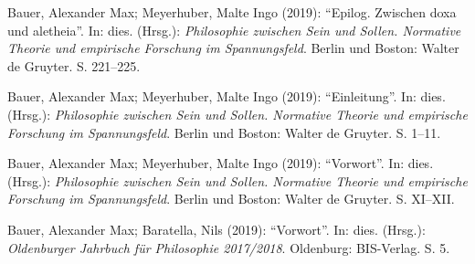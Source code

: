 \documentclass[a4paper,10pt]{article}
\newenvironment{literature}{%
   \parskip6pt\parindent0pt\raggedright
   \def\lititem{\hangindent=1cm\hangafter1}}{%
   \par\ignorespaces}
\begin{document}
\begin{literature}
\lititem Bauer, Alexander Max; Meyerhuber, Malte Ingo (2019): \enquote{Epilog. Zwischen doxa und aletheia}. In: dies. (Hrsg.): \textit{Philosophie zwischen Sein und Sollen. Normative Theorie und empirische Forschung im Spannungsfeld}. Berlin und Boston: Walter de Gruyter. S. 221--225.

\lititem Bauer, Alexander Max; Meyerhuber, Malte Ingo (2019): \enquote{Einleitung}. In: dies. (Hrsg.): \textit{Philosophie zwischen Sein und Sollen. Normative Theorie und empirische Forschung im Spannungsfeld}. Berlin und Boston: Walter de Gruyter. S. 1--11.

\lititem Bauer, Alexander Max; Meyerhuber, Malte Ingo (2019): \enquote{Vorwort}. In: dies. (Hrsg.): \textit{Philosophie zwischen Sein und Sollen. Normative Theorie und empirische Forschung im Spannungsfeld}. Berlin und Boston: Walter de Gruyter. S. XI--XII.

\lititem Bauer, Alexander Max; Baratella, Nils (2019): \enquote{Vorwort}. In: dies. (Hrsg.): \textit{Oldenburger Jahrbuch für Philosophie 2017/2018}. Oldenburg: BIS-Verlag. S. 5.
\end{literature}
\end{document}
